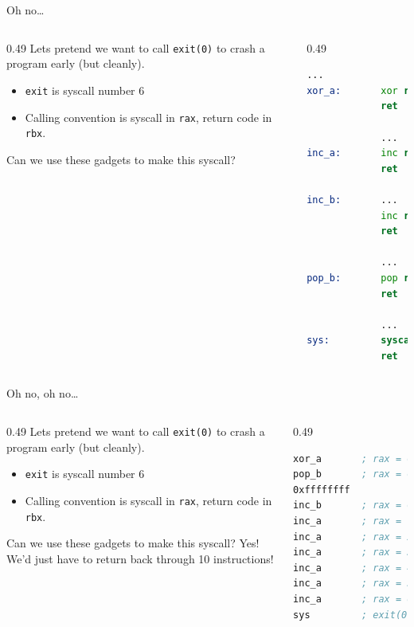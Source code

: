 \documentclass[9pt,aspectratio=169]{beamer}
\begin{document}
\begin{frame}[label={sec:orga202dc7},fragile]{Oh no\ldots{}}
 \begin{columns}
\begin{column}[t]{0.49\columnwidth}
Lets pretend we want to call \texttt{exit(0)} to crash a program early (but cleanly).
\begin{itemize}
\item \texttt{exit} is syscall number 6
\item Calling convention is syscall in \texttt{rax}, return code in \texttt{rbx}.
\end{itemize}
\begin{block}{Can we use these gadgets to make this syscall?}
\end{block}
\end{column}
\begin{column}[t]{0.49\columnwidth}
\begin{lstlisting}[language=asm,numbers=none]
  ...
xor_a:       xor rax, rax
             ret

             ...
inc_a:       inc rax
             ret

inc_b:       ...
             inc rbx
             ret

             ...
pop_b:       pop rbx
             ret

             ...
sys:         syscall
             ret
\end{lstlisting}
\end{column}
\end{columns}
\end{frame}
\begin{frame}[label={sec:org7eb32ff},fragile]{Oh no, oh no\ldots{}}
 \begin{columns}
\begin{column}[t]{0.49\columnwidth}
Lets pretend we want to call \texttt{exit(0)} to crash a program early (but cleanly).
\begin{itemize}
\item \texttt{exit} is syscall number 6
\item Calling convention is syscall in \texttt{rax}, return code in \texttt{rbx}.
\end{itemize}
\begin{block}{Can we use these gadgets to make this syscall?}
Yes! We'd just have to return back through 10 instructions!
\end{block}
\end{column}
\begin{column}[t]{0.49\columnwidth}
\begin{lstlisting}[language=asm,numbers=none]
xor_a       ; rax = 0, rbx = ?
pop_b       ; rax = 0, rbx = 0xffffffff
0xffffffff
inc_b       ; rax = 0; rbx = 0
inc_a       ; rax = 1, rbx = 0
inc_a       ; rax = 2, rbx = 0
inc_a       ; rax = 3, rbx = 0
inc_a       ; rax = 4, rbx = 0
inc_a       ; rax = 5, rbx = 0
inc_a       ; rax = 6, rbx = 0
sys         ; exit(0)
\end{lstlisting}
\end{column}
\end{columns}
\end{frame}
\end{document}
